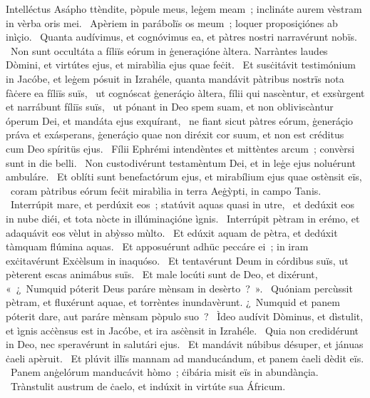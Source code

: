 { Intelléctus Asápho}
{%
ttèndite, pòpule meus, leġem meam~; inclináte aurem vèstram in vèrba oris mei. 
~Apèriem in parábolïs os meum~; loquer proposiçiónes ab inìçio. 
~Quanta audívimus, et cognóvimus ea, et pàtres nostri narravérunt nobïs. 
~Non sunt occultáta a fíliïs eórum in ġeneraçióne àltera. Narràntes laudes Dòmini, et virtútes ejus, et mirabìlia ejus quae feċit. 
~Et susċitávit testimónium in Jacóbe, et leġem pósuit in Izrahéle, quanta mandávit pàtribus nostrïs nota fàċere ea fíliïs suïs, 
~ut cognóscat ġeneráçio àltera, fílii qui nascèntur, et exsùrgent et narrábunt fíliïs suïs, 
~ut pónant in Deo spem suam, et non obliviscàntur óperum Dei, et mandáta ejus exquírant, 
~ne fiant sicut pàtres eórum, ġeneráçio práva et exásperans, ġeneráçio quae non diréxit cor suum, et non est créditus cum Deo spíritüs ejus. 
~Fílii Ephrémi intendèntes et mittèntes arcum~; convèrsi sunt in die belli. 
~Non custodivérunt testamèntum Dei, et in leġe ejus noluérunt ambuláre. 
~Et oblíti sunt benefactórum ejus, et mirabílium ejus quae ostènsit eïs, 
~coram pàtribus eórum feċit mirabìlia in terra Aeġỳpti, in campo Tanis. 
~Interrúpit mare, et perdúxit eos~; statúvit aquas quasi in utre, 
~et dedúxit eos in nube diéi, et tota nòcte in illúminaçióne ìgnis. 
~Interrúpit pètram in erémo, et adaquávit eos vèlut in abỳsso mùlto. 
~Et edúxit aquam de pètra, et dedúxit tàmquam flúmina aquas. 
~Et apposuérunt adhüc peccáre ei~; in iram exċitavérunt Exċèlsum in inaquóso. 
~Et tentavérunt Deum in córdibus suïs, ut pèterent escas animábus suïs. 
~Et male locúti sunt de Deo, et dixérunt, «~¿~Numquid póterit Deus paráre mènsam in desèrto~?~». 
~Quóniam percùssit pètram, et fluxérunt aquae, et torrèntes inundavèrunt. ¿~Numquid et panem póterit dare, aut paráre mènsam pòpulo suo~? 
~Ìdeo audívit Dòminus, et dìstulit, et ìgnis acċènsus est in Jacóbe, et ira asċènsit in Izrahéle. 
~Quia non credidérunt in Deo, nec speravérunt in salutári ejus. 
~Et mandávit núbibus désuper, et jánuas ċaeli apèruit. 
~Et plúvit illïs mannam ad manducándum, et panem ċaeli dèdit eïs. 
~Panem anġelórum manducávit hòmo~; ċibária misit eïs in abundànçia. 
~Trànstulit austrum de ċaelo, et indúxit in virtúte sua Áfricum. 
}
